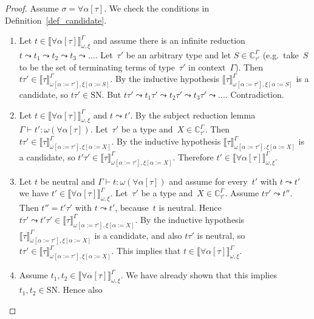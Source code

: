 \documentclass[runningheads,a4paper]{llncs}
\newcommand{\subst}[2]{#1:=#2}
\newcommand{\SN}{\mathrm{SN}}
\newcommand{\Cb}{\mathbb{C}}
\newcommand{\val}[3]{\ensuremath{\llbracket#1\rrbracket_{#2}^{#3}}}
\newcommand{\proves}{\vdash}
\begin{document}
\begin{proof}
  Assume $\sigma = \forall\alpha[\tau]$. We check the conditions in
  Definition~\ref{def_candidate}.
  \begin{enumerate}
  \item Let $t \in \val{\forall\alpha[\tau]}{\omega,\xi}{\Gamma}$ and
    assume there is an infinite reduction
    $t \leadsto t_1 \leadsto t_2 \leadsto t_3 \leadsto
    \ldots$. Let~$\tau'$ be an arbitrary type and let
    $S \in \Cb_{\tau'}^\Gamma$ (e.g.~take~$S$ to be the set of
    terminating terms of type~$\tau'$ in context~$\Gamma$). Then
    $t \tau' \in
    \val{\tau}{\omega[\subst{\alpha}{\tau'}],\xi[\subst{\alpha}{S}]}{\Gamma}$. By
    the inductive hypothesis
    $\val{\tau}{\omega[\subst{\alpha}{\tau'}],\xi[\subst{\alpha}{S}]}{\Gamma}$
    is a candidate, so $t \tau' \in \SN$. But
    $t \tau' \leadsto t_1 \tau' \leadsto t_2 \tau' \leadsto t_3 \tau'
    \leadsto \ldots$. Contradiction.
  \item Let $t \in \val{\forall\alpha[\tau]}{\omega,\xi}{\Gamma}$ and
    $t \leadsto t'$. By the subject reduction lemma
    $\Gamma \proves t' : \omega(\forall\alpha[\tau])$. Let~$\tau'$ be
    a type and~$X \in \Cb_{\tau'}^\Gamma$. Then
    $t \tau' \in
    \val{\tau}{\omega[\subst{\alpha}{\tau'}],\xi[\subst{\alpha}{X}]}{\Gamma}$. By
    the inductive hypothesis
    $\val{\tau}{\omega[\subst{\alpha}{\tau'}],\xi[\subst{\alpha}{X}]}{\Gamma}$
    is a candidate, so
    $t' \tau' \in
    \val{\tau}{\omega[\subst{\alpha}{\tau'}],\xi[\subst{\alpha}{X}]}{\Gamma}$. Therefore
    $t' \in \val{\forall\alpha[\tau]}{\omega,\xi}{\Gamma}$.
  \item Let $t$ be neutral and
    $\Gamma \proves t : \omega(\forall\alpha[\tau])$ and assume for
    every~$t'$ with $t \leadsto t'$ we have
    $t' \in
    \val{\forall\alpha[\tau]}{\omega,\xi}{\Gamma}$. Let~$\tau'$ be a
    type and~$X \in \Cb_{\tau'}^\Gamma$. Assume
    $t \tau' \leadsto t''$. Then $t'' = t' \tau'$ with
    $t \leadsto t'$, because~$t$ is neutral. Hence
    $t \tau' \leadsto t' \tau' \in
    \val{\tau}{\omega[\subst{\alpha}{\tau'}],\xi[\subst{\alpha}{X}]}{\Gamma}$. By
    the inductive
    hypothesis~$\val{\tau}{\omega[\subst{\alpha}{\tau'}],\xi[\subst{\alpha}{X}]}{\Gamma}$
    is a candidate, and also $t \tau'$ is neutral, so
    $t \tau' \in
    \val{\tau}{\omega[\subst{\alpha}{\tau'}],\xi[\subst{\alpha}{X}]}{\Gamma}$. This
    implies that
    $t \in \val{\forall\alpha[\tau]}{\omega,\xi}{\Gamma}$.
  \item Assume
    $t_1,t_2 \in \val{\forall\alpha[\tau]}{\omega,\xi}{\Gamma}$. We
    have already shown that this implies $t_1,t_2 \in \SN$. Hence also

\end{enumerate}
\end{proof}
\end{document}
